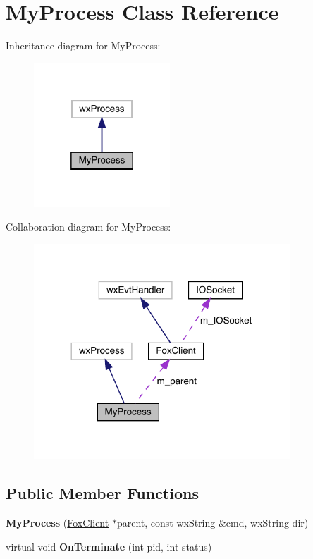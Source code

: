 \hypertarget{class_my_process}{}\section{My\+Process Class Reference}
\label{class_my_process}


Inheritance diagram for My\+Process\+:
\nopagebreak
\begin{figure}[H]
\begin{center}
\leavevmode
\includegraphics[width=145pt]{class_my_process__inherit__graph}
\end{center}
\end{figure}


Collaboration diagram for My\+Process\+:
\nopagebreak
\begin{figure}[H]
\begin{center}
\leavevmode
\includegraphics[width=272pt]{class_my_process__coll__graph}
\end{center}
\end{figure}
\subsection*{Public Member Functions}
\begin{DoxyCompactItemize}
\item 
\mbox{\label{class_my_process_a990c37ea4c7ea3d4470ca9a6751c6f38}} 
{\bfseries My\+Process} (\mbox{\hyperlink{class_fox_client}{Fox\+Client}} $\ast$parent, const wx\+String \&cmd, wx\+String dir)
\item 
\mbox{\label{class_my_process_a8d66313f28d1820169bb1b46f89880b9}} 
virtual void {\bfseries On\+Terminate} (int pid, int status)
\end{DoxyCompactItemize}
